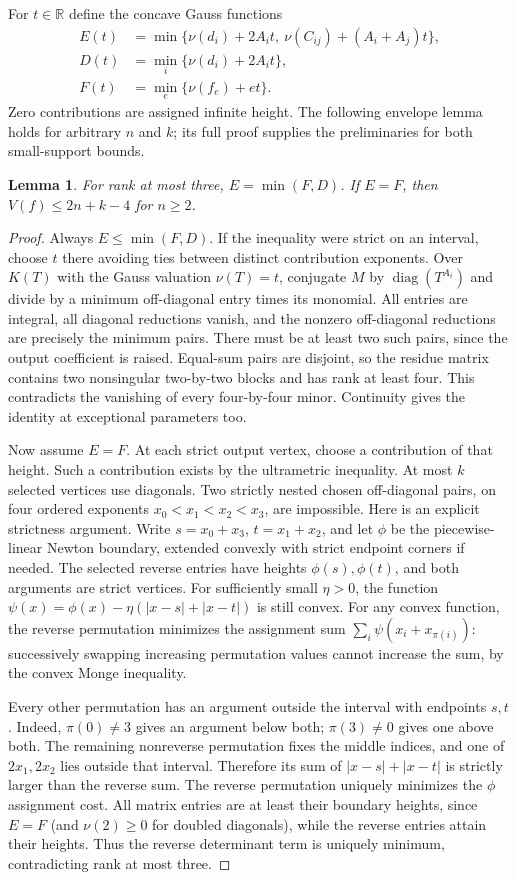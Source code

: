 \documentclass[11pt]{article}
\newtheorem{lemma}[theorem]{Lemma}
\theoremstyle{remark}\newtheorem{remark}[theorem]{Remark}
\newcommand{\val}{\nu}
\newcommand{\R}{\mathbb R}
\begin{document}
For $t\in\R$ define the concave Gauss functions
\begin{align*}
 E(t)&=\min\{\val(d_i)+2A_it,\ \val(C_{ij})+(A_i+A_j)t\},\\
 D(t)&=\min_i\{\val(d_i)+2A_it\},\\
 F(t)&=\min_e\{\val(f_e)+et\}.
\end{align*}
Zero contributions are assigned infinite height. The following envelope
lemma holds for arbitrary $n$ and $k$; its full proof supplies the
preliminaries for both small-support bounds.

\begin{lemma}\label{lem:envelope}
For rank at most three, $E=\min(F,D)$. If $E=F$, then
$V(f)\le2n+k-4$ for $n\ge2$.
\end{lemma}
\begin{proof}
Always $E\le\min(F,D)$. If the inequality were strict on an interval,
choose $t$ there avoiding ties between distinct contribution exponents.
Over $K(T)$ with the Gauss valuation $\val(T)=t$, conjugate $M$ by
$\operatorname{diag}(T^{A_i})$ and divide by a minimum off-diagonal
entry times its monomial. All entries are integral, all diagonal
reductions vanish, and the nonzero off-diagonal reductions are precisely
the minimum pairs. There must be at least two such pairs, since the
output coefficient is raised. Equal-sum pairs are disjoint, so the
residue matrix contains two nonsingular two-by-two blocks and has rank
at least four. This contradicts the vanishing of every four-by-four
minor. Continuity gives the identity at exceptional parameters too.

Now assume $E=F$. At each strict output vertex, choose a contribution
of that height. Such a contribution exists by the ultrametric inequality.
At most $k$ selected vertices use diagonals. Two strictly nested chosen
off-diagonal pairs, on four ordered exponents $x_0<x_1<x_2<x_3$, are
impossible. Here is an explicit strictness argument. Write
$s=x_0+x_3$, $t=x_1+x_2$, and let $\phi$ be the piecewise-linear
Newton boundary, extended convexly with strict endpoint corners if needed.
The selected reverse entries have heights $\phi(s),\phi(t)$, and
both arguments are strict vertices. For sufficiently small $\eta>0$,
the function
$\psi(x)=\phi(x)-\eta(|x-s|+|x-t|)$ is still convex.
For any convex function, the reverse permutation minimizes the assignment
sum $\sum_i\psi(x_i+x_{\pi(i)})$: successively swapping increasing
permutation values cannot increase the sum, by the convex Monge inequality.

Every other permutation has an argument outside the interval with
endpoints $s,t$. Indeed, $\pi(0)\ne3$ gives an argument below both;
$\pi(3)\ne0$ gives one above both. The remaining nonreverse permutation
fixes the middle indices, and one of $2x_1,2x_2$ lies outside that
interval. Therefore its sum of $|x-s|+|x-t|$ is strictly larger than
the reverse sum. The reverse permutation uniquely minimizes the
$\phi$ assignment cost. All matrix entries are at least their boundary
heights, since $E=F$ (and $\val(2)\ge0$ for doubled diagonals), while
the reverse entries attain their heights. Thus the reverse determinant
term is uniquely minimum, contradicting rank at most three.


\end{proof}
\end{document}
